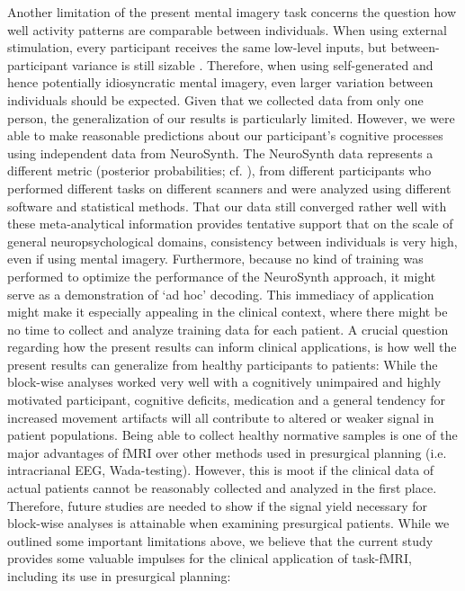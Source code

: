 \documentclass[fleqn,10pt]{SelfArx} %
\begin{document}
Another limitation of the present mental imagery task concerns the question how well activity patterns are comparable between individuals. When using external stimulation, every participant receives the same low-level inputs, but between-participant variance is still sizable \citep{Haxby_2011}. Therefore, when using self-generated and hence potentially idiosyncratic mental imagery, even larger variation between individuals should be expected. Given that we collected data from only one person, the generalization of our results is particularly limited. However, we were able to make reasonable predictions about our participant's cognitive processes using independent data from NeuroSynth. The NeuroSynth data represents a different metric (posterior probabilities; cf. \citep{Yarkoni_2011}), from different participants who performed different tasks on different scanners and were analyzed using different software and statistical methods. That our data still converged rather well with these meta-analytical information provides tentative support that on the scale of general neuropsychological domains, consistency between individuals is very high, even if using mental imagery. Furthermore, because no kind of training was performed to optimize the performance of the NeuroSynth approach, it might serve as a demonstration of ‘ad hoc’ decoding. This immediacy of application might make it especially appealing in the clinical context, where there might be no time to collect and analyze training data for each patient.
A crucial question regarding how the present results can inform clinical applications, is how well the present results can generalize from healthy participants to patients: While the block-wise analyses worked very well with a cognitively unimpaired and highly motivated participant, cognitive deficits, medication and a general tendency for increased movement artifacts \citep{Van_Dijk_2012} will all contribute to altered or weaker signal in patient populations. Being able to collect healthy normative samples \citep{Dubois_2016} is one of the major advantages of fMRI over other methods used in presurgical planning (i.e. intracrianal EEG, Wada-testing). However, this is moot if the clinical data of actual patients cannot be reasonably collected and analyzed in the first place. Therefore, future studies are needed to show if the signal yield necessary for block-wise analyses is attainable when examining presurgical patients.
While we outlined some important limitations above, we believe that the current study provides some valuable impulses for the clinical application of task-fMRI, including its use in presurgical planning: \\
\end{document}
